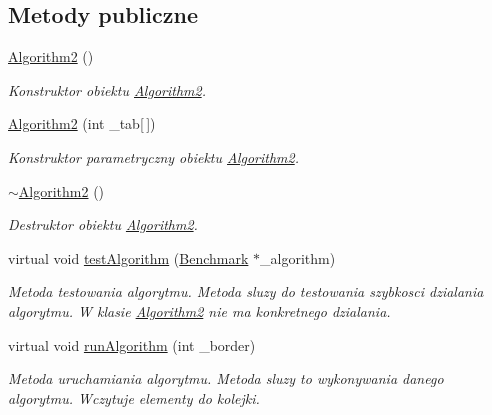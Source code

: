 \subsection*{Metody publiczne}
\begin{DoxyCompactItemize}
\item 
\hyperlink{class_algorithm2_ad77a51433815456eca8139444e78b49b}{Algorithm2} ()
\begin{DoxyCompactList}\small\item\em Konstruktor obiektu \hyperlink{class_algorithm2}{Algorithm2}. \end{DoxyCompactList}\item 
\hyperlink{class_algorithm2_ac5cc064a2727d2c1a2b32d335cd73f8d}{Algorithm2} (int \-\_\-tab\mbox{[}$\,$\mbox{]})
\begin{DoxyCompactList}\small\item\em Konstruktor parametryczny obiektu \hyperlink{class_algorithm2}{Algorithm2}. \end{DoxyCompactList}\item 
\hyperlink{class_algorithm2_ab2c630f56f5d2e90f62a13fdaf0cd954}{$\sim$\-Algorithm2} ()
\begin{DoxyCompactList}\small\item\em Destruktor obiektu \hyperlink{class_algorithm2}{Algorithm2}. \end{DoxyCompactList}\item 
virtual void \hyperlink{class_algorithm2_a6eb066d5e51f2187e717454751bc2934}{test\-Algorithm} (\hyperlink{class_benchmark}{Benchmark} $\ast$\-\_\-algorithm)
\begin{DoxyCompactList}\small\item\em Metoda testowania algorytmu. Metoda sluzy do testowania szybkosci dzialania algorytmu. W klasie \hyperlink{class_algorithm2}{Algorithm2} nie ma konkretnego dzialania. \end{DoxyCompactList}\item 
virtual void \hyperlink{class_algorithm2_a409e58d5fb0b6d2407cc986cf163703b}{run\-Algorithm} (int \-\_\-border)
\begin{DoxyCompactList}\small\item\em Metoda uruchamiania algorytmu. Metoda sluzy to wykonywania danego algorytmu. Wczytuje elementy do kolejki. \end{DoxyCompactList}\end{DoxyCompactItemize}
